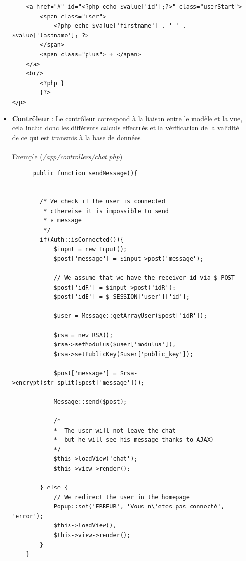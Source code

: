 \documentclass[12pt,a4paper]{report}
\begin{document}
\begin{itemize}
\begin{lstlisting}
    <a href="#" id="<?php echo $value['id'];?>" class="userStart">
        <span class="user">
            <?php echo $value['firstname'] . ' ' . $value['lastname']; ?>
        </span>
        <span class="plus"> + </span>
    </a>
    <br/>
        <?php }
        }?>
</p>
    \end{lstlisting}
    
    \item \textbf{Contrôleur} : Le contrôleur correspond à la liaison entre le modèle et la vue, cela inclut donc les différents calculs effectués et la vérification de la validité de ce qui est transmis à la base de données.
    \paragraph{}
    Exemple (\textit{/app/controllers/chat.php})
    \lstset{}
    \begin{lstlisting}
      public function sendMessage(){
        
        
        /* We check if the user is connected
         * otherwise it is impossible to send 
         * a message
         */
        if(Auth::isConnected()){
            $input = new Input();
            $post['message'] = $input->post('message');
            
            // We assume that we have the receiver id via $_POST
            $post['idR'] = $input->post('idR');
            $post['idE'] = $_SESSION['user']['id'];
            
            $user = Message::getArrayUser($post['idR']);
            
            $rsa = new RSA();
            $rsa->setModulus($user['modulus']);
            $rsa->setPublicKey($user['public_key']);
            
            $post['message'] = $rsa->encrypt(str_split($post['message']));
            
            Message::send($post);
            
            /* 
            *  The user will not leave the chat 
            *  but he will see his message thanks to AJAX)
            */
            $this->loadView('chat'); 
            $this->view->render();
            
        } else {
            // We redirect the user in the homepage
            Popup::set('ERREUR', 'Vous n\'etes pas connecté', 'error');
            $this->loadView();
            $this->view->render();
        }
    }
    \end{lstlisting}
    

\end{itemize}
\end{document}
